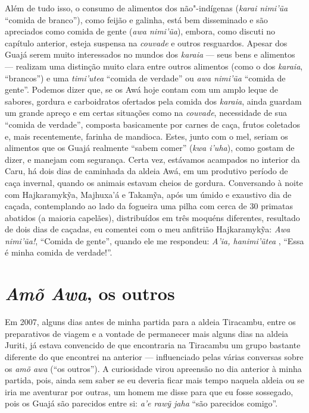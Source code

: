 Além de tudo isso, o consumo de alimentos dos não"-indígenas (\emph{karai
nimi'ũa} ``comida de branco''), como feijão e galinha, está bem
disseminado e são apreciados como comida de gente (\emph{awa nimi'ũa}),
embora, como discuti no capítulo anterior, esteja suspensa na
\emph{couvade} e outros resguardos. Apesar dos Guajá serem muito
interessados no mundos dos \emph{karaia} --- seus bens e alimentos ---
realizam uma distinção muito clara entre outros alimentos (como o dos
\emph{karaia}, ``brancos'') e uma \emph{timi'utea} ``comida de verdade'' ou
\emph{awa nimi'ũa} ``comida de gente''. Podemos dizer que, se os Awá hoje
contam com um amplo leque de sabores, gordura e carboidratos ofertados
pela comida dos \emph{karaia}, ainda guardam um grande apreço e em
certas situações como na \emph{couvade}, necessidade de sua ``comida de
verdade'', composta basicamente por carnes de caça, frutos coletados e,
mais recentemente, farinha de mandioca. Estes, junto com o mel, seriam
os alimentos que os Guajá realmente ``sabem comer'' (\emph{kwa i'uha}),
como gostam de dizer, e manejam com segurança. Certa vez, estávamos
acampados no interior da  Caru, há dois dias de caminhada da aldeia
Awá, em um produtivo período de caça invernal, quando os animais estavam
cheios de gordura. Conversando à noite com Hajkaramykỹa, Majhuxa'á e
Takamỹa, após um úmido e exaustivo dia de caçada, contemplando ao lado
da fogueira uma pilha com cerca de 30 primatas abatidos (a maioria
capelães), distribuídos em três moquéns diferentes, resultado de dois
dias de caçadas, eu comentei com o meu anfitrião Hajkaramykỹa: \emph{Awa
nimi'ũa!}, ``Comida de gente'', quando ele me respondeu: \emph{A'ia,
hanimi'ũtea} , ``Essa é minha comida de verdade!''.

\section{\emph{Amõ Awa}, os outros}\label{amuxf5-awa-os-outros}

Em 2007, alguns dias antes de minha partida para a aldeia Tiracambu,
entre os preparativos de viagem e a vontade de permanecer mais alguns
dias na aldeia Juriti, já estava convencido de que encontraria na
Tiracambu um grupo bastante diferente do que encontrei na anterior ---
influenciado pelas várias conversas sobre os \emph{amõ awa} (``os
outros''). A curiosidade virou apreensão no dia anterior à minha partida,
pois, ainda sem saber se eu deveria ficar mais tempo naquela aldeia ou
se iria me aventurar por outras, um homem me disse para que eu fosse
sossegado, pois os Guajá são parecidos entre si: \emph{a'e rawỹ jaha}
``são parecidos comigo''.

